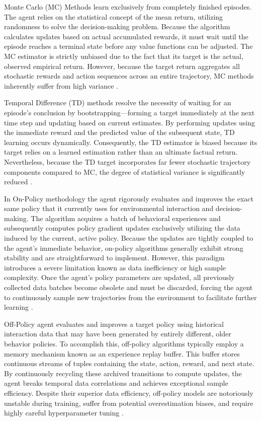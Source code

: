  Monte Carlo (MC) Methods learn exclusively from completely finished episodes. The agent relies on the statistical concept of the mean return, utilizing randomness to solve the decision-making problem. Because the algorithm calculates updates based on actual accumulated rewards, it must wait until the episode reaches a terminal state before any value functions can be adjusted. The MC estimator is strictly unbiased due to the fact that its target is the actual, observed empirical return. However, because the target return aggregates all stochastic rewards and action sequences across an entire trajectory, MC methods inherently suffer from high variance \cite{NaeemMuddasar2020AGIt}.


Temporal Difference (TD) methods resolve the necessity of waiting for an episode's conclusion by bootstrapping—forming a target immediately at the next time step and updating based on current estimates. By performing updates using the immediate reward and the predicted value of the subsequent state, TD learning occurs dynamically. Consequently, the TD estimator is biased because its target relies on a learned estimation rather than an ultimate factual return. Nevertheless, because the TD target incorporates far fewer stochastic trajectory components compared to MC, the degree of statistical variance is significantly reduced \cite{NaeemMuddasar2020AGIt}.

In On-Policy methodology the agent rigorously evaluates and improves the exact same policy that it currently uses for environmental interaction and decision-making. The algorithm acquires a batch of behavioral experiences and subsequently computes policy gradient updates exclusively utilizing the data induced by the current, active policy. Because the updates are tightly coupled to the agent's immediate behavior, on-policy algorithms generally exhibit strong stability and are straightforward to implement. However, this paradigm introduces a severe limitation known as data inefficiency or high sample complexity. Once the agent's policy parameters are updated, all previously collected data batches become obsolete and must be discarded, forcing the agent to continuously sample new trajectories from the environment to facilitate further learning \cite{On-Policy_vs._Off-Policy}.

Off-Policy agent evaluates and improves a target policy using historical interaction data that may have been generated by entirely different, older behavior policies. To accomplish this, off-policy algorithms typically employ a memory mechanism known as an experience replay buffer. This buffer stores continuous streams of tuples containing the state, action, reward, and next state. By continuously recycling these archived transitions to compute updates, the agent breaks temporal data correlations and achieves exceptional sample efficiency. Despite their superior data efficiency, off-policy models are notoriously unstable during training, suffer from potential overestimation biases, and require highly careful hyperparameter tuning \cite{On-Policy_vs._Off-Policy}.


